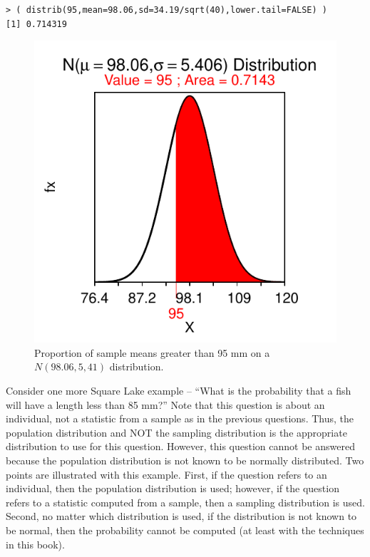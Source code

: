 \documentclass[10pt,openany]{book}\usepackage[]{graphicx}\usepackage[]{color}
\makeatletter
\newenvironment{kframe}{%
 \def\at@end@of@kframe{}%
 \ifinner\ifhmode%
  \def\at@end@of@kframe{\end{minipage}}%
  \begin{minipage}{\columnwidth}%
 \fi\fi%
 \def\FrameCommand##1{\hskip\@totalleftmargin \hskip-\fboxsep
 \colorbox{shadecolor}{##1}\hskip-\fboxsep
     \hskip-\linewidth \hskip-\@totalleftmargin \hskip\columnwidth}%
 \MakeFramed {\advance\hsize-\width
   \@totalleftmargin\z@ \linewidth\hsize
   \@setminipage}}%
 {\par\unskip\endMakeFramed%
 \at@end@of@kframe}
\newenvironment{knitrout}{}{} %
\makeatother
\begin{document}
\begin{knitrout}
\color{fgcolor}\begin{kframe}
\begin{verbatim}
> ( distrib(95,mean=98.06,sd=34.19/sqrt(40),lower.tail=FALSE) )
[1] 0.714319
\end{verbatim}
\end{kframe}\begin{figure}[hbtp]

{\centering \includegraphics[width=.4\linewidth]{Figs/NormTLgt95-1} 

}

\caption[Proportion of sample means greater than 95 mm on a $N(98.06,5,41)$ distribution]{Proportion of sample means greater than 95 mm on a $N(98.06,5,41)$ distribution.}\label{fig:NormTLgt95}
\end{figure}


\end{knitrout}


Consider one more Square Lake example  -- ``What is the probability that a fish will have a length less than 85 mm?''  Note that this question is about an individual, not a statistic from a sample as in the previous questions.  Thus, the population distribution and NOT the sampling distribution is the appropriate distribution to use for this question.  However, this question cannot be answered because the population distribution is not known to be normally distributed.  Two points are illustrated with this example.  First, if the question refers to an individual, then the population distribution is used; however, if the question refers to a statistic computed from a sample, then a sampling distribution is used.  Second, no matter which distribution is used, if the distribution is not known to be normal, then the probability cannot be computed (at least with the techniques in this book).
\end{document}
